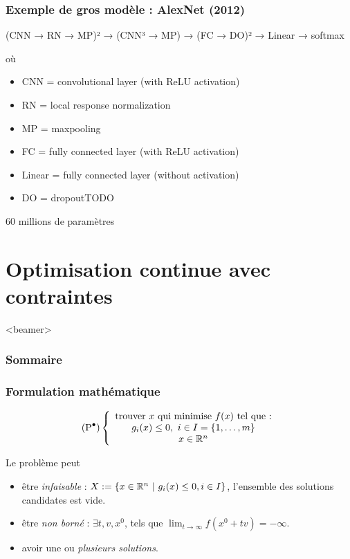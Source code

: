\documentclass{beamer}
\newcommand{\R}{{\ensuremath\mathbb{R}}}
\begin{document}
\begin{frame}
  \frametitle{Exemple de gros modèle : AlexNet (2012)}

    (CNN → RN → MP)² → (CNN³ → MP) → (FC → DO)² → Linear → softmax

où

\begin{itemize}
\item     CNN = convolutional layer (with ReLU activation)
\item     RN = local response normalization
\item     MP = maxpooling
\item     FC = fully connected layer (with ReLU activation)
\item     Linear = fully connected layer (without activation)
\item     DO = dropoutTODO
\end{itemize}

60 millions de paramètres 

\end{frame}

\section{Optimisation continue avec contraintes}

\begin{frame}<beamer>
  \frametitle{Sommaire}
  \tableofcontents[currentsection]
\end{frame}

\begin{frame}
  \frametitle{Formulation mathématique}

  \[
  (\text{P}^\bullet) \left\{
  \begin{array}{c}
    \text{trouver} \ x \ \text{qui minimise} \ f(x) \ \text{tel que :} \\
    g_i(x) \leq 0, \ i \in I = \{1, \dots, m\} \\
    x \in \R^n
  \end{array}
  \right.
  \]

  \begin{block}{Le problème peut}
    \begin{itemize}
    \item être \emph{infaisable} :
      $X := \{ x \in \R^n \ | \ g_i(x) \leq 0, i \in I \}$,
      l'ensemble des solutions candidates est vide.
    \item être \emph{non borné} : $\exists t, v, x^0$, tels que $\lim_{t \rightarrow \infty} f(x^0 + tv) = -\infty$.
    \item avoir une ou \emph{plusieurs solutions}. 
    \end{itemize}
  \end{block}
  
\end{frame}
\end{document}
